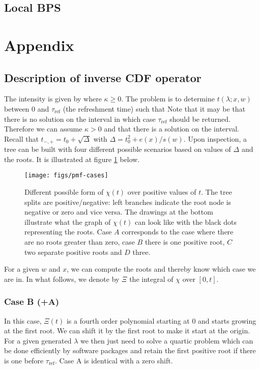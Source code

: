 \subsection{Local BPS}


\appendix
\section{Appendix}
\subsection{\label{ref:inverseop1}Description of inverse CDF operator}
The intensity is given by
%
%
where $\kappa\ge0$. The problem is to determine $t(\lambda; x,w)$ between $0$ and $\tau_{\text{ref}}$ (the refreshment time) such that
%
Note that it may be that there is no solution on the interval in which case $\tau_{\text{ref}}$ should be returned. Therefore we can assume $\kappa>0$ and that there is a solution on the interval. Recall that $t_{-,+}=t_{0}+\sqrt{\Delta}$ with $\Delta = t_{0}^{2}+e(x)/s(w)$. Upon inspection, a tree can be built with four different possible scenarios based on values of $\Delta$ and the roots. It is illustrated at figure \ref{fig:pmf-cases} below. 

\begin{figure}[!h]
\center
	\texttt{[image: figs/pmf-cases]}
	\caption{\label{fig:pmf-cases}Different possible form of $\chi(t)$ over positive values of $t$. The tree splits are positive/negative: left branches indicate the root node is negative or zero and vice versa. The drawings at the bottom illustrate what the graph of $\chi(t)$ can look like with the black dots representing the roots. Case $A$ corresponds to the case where there are no roots greater than zero, case $B$ there is one positive root, $C$ two separate positive roots and $D$ three.}
\end{figure}

For a given $w$ and $x$, we can compute the roots and thereby know which case we are in. In what follows, we denote by $\Xi$ the integral of $\chi$ over $[0,t]$.

\subsubsection*{Case B (+A)}
In this case, $\Xi(t)$ is a fourth order polynomial starting at 0 and starts growing at the first root. We can shift it by the first root to make it start at the origin. For a given generated $\lambda$ we then just need to solve a quartic problem which can be done efficiently by software packages and retain the first positive root if there is one before $\tau_{\text{ref}}$. Case A is identical with a zero shift.

